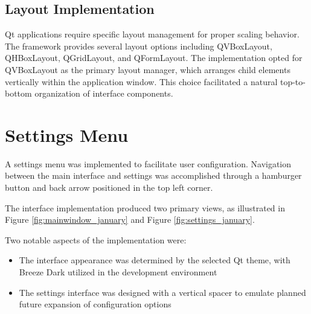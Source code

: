 \subsection{Layout Implementation}
Qt applications require specific layout management for proper scaling behavior.
The framework provides several layout options including QVBoxLayout, QHBoxLayout, QGridLayout, and QFormLayout.
The implementation opted for QVBoxLayout as the primary layout manager,
which arranges child elements vertically within the application window.
This choice facilitated a natural top-to-bottom organization of interface components.

\newpage
\section{Settings Menu}
A settings menu was implemented to facilitate user configuration.
Navigation between the main interface and settings was accomplished through
a hamburger button and back arrow positioned in the top left corner.

The interface implementation produced two primary views, as illustrated in Figure \ref{fig:mainwindow_january}
and Figure \ref{fig:settings_january}.

Two notable aspects of the implementation were:
\begin{itemize}
\item The interface appearance was determined by the selected Qt theme, with Breeze Dark utilized in the development environment
\item The settings interface was designed with a vertical spacer to emulate planned future expansion of configuration options
\end{itemize}

